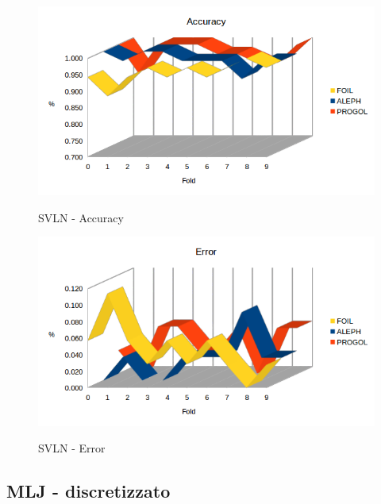 \begin{figure}[H]
	\includegraphics[width=1.1\textwidth]{img/datasetGraph/svln/accuracy.png}
	\label{svln-Accuracy}
	\caption{SVLN - Accuracy}
\end{figure}

\begin{figure}[H]
	\includegraphics[width=1.1\textwidth]{img/datasetGraph/svln/error.png}
	\label{svln-Error}
	\caption{SVLN - Error}
\end{figure}

\subsection{MLJ - discretizzato}
